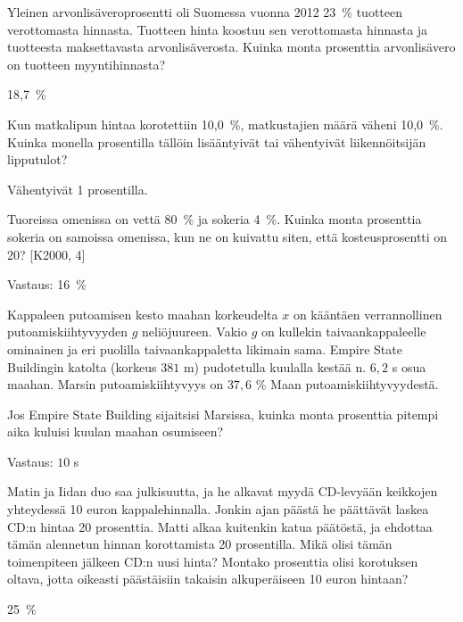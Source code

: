 \begin{tehtava}
	Yleinen arvonlisäveroprosentti oli Suomessa vuonna 2012 23~\% tuotteen verottomasta 
	hinnasta. Tuotteen hinta koostuu sen verottomasta hinnasta 
	ja tuotteesta maksettavasta arvonlisäverosta. Kuinka monta 
	prosenttia arvonlisävero on tuotteen myyntihinnasta?
	\begin{vastaus}
		18,7~\%
	\end{vastaus}
\end{tehtava}

\begin{tehtava}
	Kun matkalipun hintaa korotettiin 10,0~\%, matkustajien määrä väheni 10,0~\%. 
	Kuinka monella prosentilla tällöin lisääntyivät tai vähentyivät liikennöitsijän 
	lipputulot?
	\begin{vastaus}
		Vähentyivät 1 prosentilla.
	\end{vastaus}
\end{tehtava}

\begin{tehtava}
    Tuoreissa omenissa on vettä 80~\% ja sokeria 4~\%. Kuinka monta prosenttia sokeria on samoissa omenissa, kun ne on kuivattu siten, että kosteusprosentti on 20? [K2000, 4]
    \begin{vastaus}
        Vastaus: 16~\%
    \end{vastaus}
\end{tehtava}

\begin{tehtava}
    Kappaleen putoamisen kesto maahan korkeudelta $x$ on kääntäen verrannollinen putoamiskiihtyvyyden $g$ neliöjuureen. Vakio $g$ on kullekin taivaankappaleelle ominainen ja eri puolilla taivaankappaletta likimain sama. Empire State Buildingin katolta (korkeus $381$ m) pudotetulla kuulalla kestää n. $6,2$ s osua maahan. Marsin putoamiskiihtyvyys on $37,6$ \% Maan putoamiskiihtyvyydestä. 
    
    Jos Empire State Building sijaitsisi Marsissa, kuinka monta prosenttia pitempi aika kuluisi kuulan maahan osumiseen?
    \begin{vastaus}
        Vastaus: $10$ s
    \end{vastaus}
\end{tehtava}

\begin{tehtava}
Matin ja Iidan duo saa julkisuutta, ja he alkavat myydä CD-levyään keikkojen yhteydessä 10 euron kappalehinnalla. Jonkin ajan päästä he päättävät laskea CD:n hintaa 20 prosenttia. Matti alkaa kuitenkin katua päätöstä, ja ehdottaa tämän alennetun hinnan korottamista 20 prosentilla. Mikä olisi tämän toimenpiteen jälkeen CD:n uusi hinta? Montako prosenttia olisi korotuksen oltava, jotta oikeasti päästäisiin takaisin alkuperäiseen 10 euron hintaan?
    \begin{vastaus}
25~\%
    \end{vastaus}
\end{tehtava}

